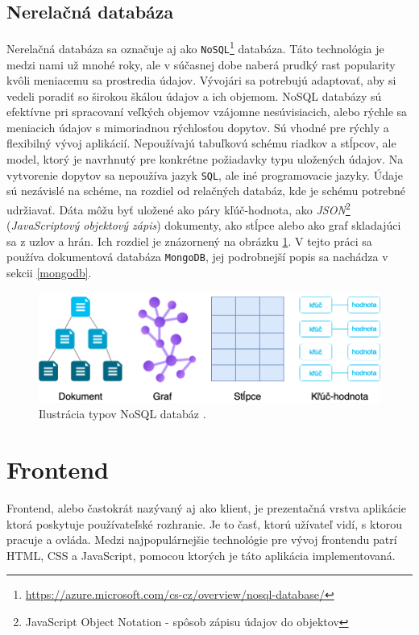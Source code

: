 \subsection{Nerelačná databáza}
Nerelačná databáza sa označuje aj ako \texttt{NoSQL}\footnote{\url{https://azure.microsoft.com/cs-cz/overview/nosql-database/}} databáza. Táto technológia je medzi nami už mnohé roky, ale v súčasnej dobe naberá prudký rast popularity kvôli meniacemu sa prostredia údajov. Vývojári sa potrebujú adaptovať, aby si vedeli poradiť so širokou škálou údajov a ich objemom. NoSQL databázy sú efektívne pri spracovaní veľkých objemov vzájomne nesúvisiacich, alebo rýchle sa meniacich údajov s mimoriadnou rýchlosťou dopytov\cite{nosql}. Sú vhodné pre rýchly a flexibilný vývoj aplikácií. Nepoužívajú tabuľkovú schému riadkov a stĺpcov, ale model, ktorý je navrhnutý pre konkrétne požiadavky typu uložených údajov. Na vytvorenie dopytov sa nepoužíva jazyk \texttt{SQL}, ale iné programovacie jazyky. Údaje sú nezávislé na schéme, na rozdiel od relačných databáz, kde je schému potrebné udržiavať. Dáta môžu byť uložené ako páry kľúč-hodnota, ako \textit{JSON}\footnote{JavaScript Object Notation - spôsob zápisu údajov do objektov} (\textit{JavaScriptový objektový zápis}) dokumenty, ako stĺpce alebo ako graf skladajúci sa z uzlov a hrán. Ich rozdiel je znázornený na obrázku \ref{pic:nosql_types}. V tejto práci sa používa dokumentová databáza \texttt{MongoDB}, jej podrobnejší popis sa nachádza v sekcii \ref{mongodb}.

    \begin{figure}[!hbt]
        \centering
        \includegraphics[scale=0.45]{obrazky/nosql_types.png}
        \caption{Ilustrácia typov NoSQL databáz \cite{nosql}.}
        \label{pic:nosql_types}
    \end{figure}

\section{Frontend}
Frontend, alebo častokrát nazývaný aj ako klient, je prezentačná vrstva aplikácie ktorá poskytuje používateľské rozhranie. Je to časť, ktorú užívateľ vidí, s ktorou pracuje a ovláda. Medzi najpopulárnejšie technológie pre vývoj frontendu patrí HTML, CSS a JavaScript, pomocou ktorých je táto aplikácia implementovaná. 


